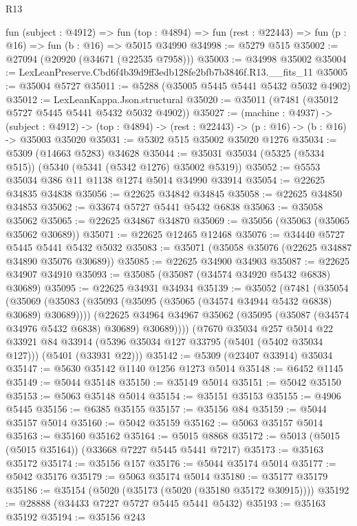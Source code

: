 \begin{lexlean}{R13}
\begin{coremodule}
  fun (subject : @4912) =>
  fun (top : @4894) => fun (rest : @22443) => fun (p : @16) => fun (b : @16) => @5015 @34990
@34998 := @5279 @515
@35002 := @27094 (@20920 (@34671 (@22535 @7958)))
@35003 := @34998 @35002
@35004 := LexLeanPreserve.Cbd6f4b39d9ff3edb128fe2bfb7b3846f.R13.__fits_11
@35005 := @35004 @5727
@35011 := @5288 (@35005 @5445 @5441 @5432 @5032 @4902)
@35012 := LexLeanKappa.Json.structural
@35020 := @35011 (@7481 (@35012 @5727 @5445 @5441 @5432 @5032 @4902))
@35027 := (machine : @4937) ->
  (subject : @4912) -> (top : @4894) -> (rest : @22443) -> (p : @16) -> (b : @16) -> @35003 @35020
@35031 := @5302 @515 @35002 @35020 @1276
@35034 := @5309 (@14663 @5283) @34628
@35044 := @35031 @35034 (@5325 (@5334 @515)) (@5340 (@5341 (@5342 @1276) @35002 @5319))
@35052 := @5553 @35034 @386 @11 @1138 @1274 @5014 @34990 @33914
@35054 := @22625 @34835 @34838
@35056 := @22625 @34842 @34845
@35058 := @22625 @34850 @34853
@35062 := @33674 @5727 @5441 @5432 @6838
@35063 := @35058 @35062
@35065 := @22625 @34867 @34870
@35069 := @35056 (@35063 (@35065 @35062 @30689))
@35071 := @22625 @12465 @12468
@35076 := @34440 @5727 @5445 @5441 @5432 @5032
@35083 := @35071 (@35058 @35076 (@22625 @34887 @34890 @35076 @30689))
@35085 := @22625 @34900 @34903
@35087 := @22625 @34907 @34910
@35093 := @35085 (@35087 (@34574 @34920 @5432 @6838) @30689)
@35095 := @22625 @34931 @34934
@35139 := @35052
    (@7481
      (@35054
        (@35069 (@35083 (@35093 (@35095 (@35065 (@34574 @34944 @5432 @6838) @30689) @30689))))
        (@22625 @34964 @34967 @35062 (@35095 (@35087 (@34574 @34976 @5432 @6838) @30689) @30689))))
    (@7670
      @35034
      @257
      @5014
      @22
      @33921
      @84
      @33914
      (@5396 @35034 @127 @33795 (@5401 (@5402 @35034 @127)))
      (@5401 (@33931 @22)))
@35142 := @5309 (@23407 @33914) @35034
@35147 := @5630 @35142 @1140 @1256 @1273 @5014
@35148 := @6452 @1145
@35149 := @5044 @35148
@35150 := @35149 @5014
@35151 := @5042 @35150
@35153 := @5063 @35148 @5014
@35154 := @35151 @35153
@35155 := @4906 @5445
@35156 := @6385 @35155
@35157 := @35156 @84
@35159 := @5044 @35157 @5014
@35160 := @5042 @35159
@35162 := @5063 @35157 @5014
@35163 := @35160 @35162
@35164 := @5015 @8868
@35172 := @5013 (@5015 (@5015 @35164)) (@33668 @7227 @5445 @5441 @7217)
@35173 := @35163 @35172
@35174 := @35156 @157
@35176 := @5044 @35174 @5014
@35177 := @5042 @35176
@35179 := @5063 @35174 @5014
@35180 := @35177 @35179
@35186 := @35154 (@5020 (@35173 (@5020 (@35180 @35172 @30915))))
@35192 := @28888 (@34433 @7227 @5727 @5445 @5441 @5432)
@35193 := @35163 @35192
@35194 := @35156 @243

\end{coremodule}
\end{lexlean}
